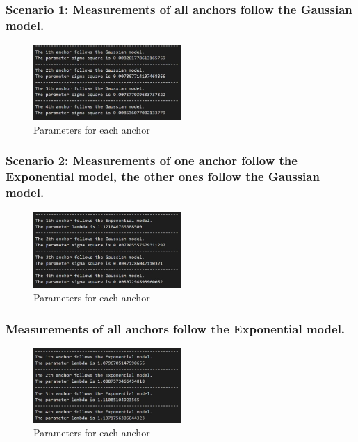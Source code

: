 \documentclass[a4paper]{article}
\begin{document}
\subsubsection{Scenario 1: Measurements of all anchors follow the Gaussian model.}
\begin{figure}[h]
	\begin{center}
		\includegraphics[width=0.5\textwidth]{scenario1param.jpg}
		\caption{Parameters for each anchor}
	\end{center}
\end{figure}
\subsubsection{Scenario 2: Measurements of one anchor follow the Exponential model, the other ones follow the Gaussian model.}
\begin{figure}[h]
	\begin{center}
		\includegraphics[width=0.5\textwidth]{scenario2param.jpg}
		\caption{Parameters for each anchor}
	\end{center}
\end{figure}

\subsubsection{Measurements of all anchors follow the Exponential model.}
\begin{figure}[h]
	\begin{center}
		\includegraphics[width=0.5\textwidth]{scenario3param.jpg}
		\caption{Parameters for each anchor}
	\end{center}
\end{figure}
\end{document}
